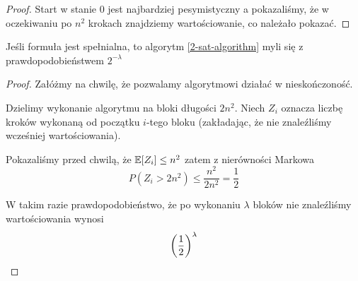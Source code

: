 \begin{proof}
	Start w stanie 0 jest najbardziej pesymistyczny a pokazaliśmy, że w oczekiwaniu po \( n^2 \) krokach znajdziemy wartościowanie, co należało pokazać.
\end{proof}

\begin{theorem}[Lemat 7.2 P\&C]
	Jeśli formuła jest spełnialna, to algorytm \ref{2-sat-algorithm} myli się z prawdopodobieństwem \( 2^{-\lambda} \)
\end{theorem}
\begin{proof}
	Załóżmy na chwilę, że pozwalamy algorytmowi działać w nieskończoność.

	Dzielimy wykonanie algorytmu na bloki długości \( 2n^2 \).
	Niech \( Z_i \) oznacza liczbę kroków wykonaną od początku \( i \)-tego bloku (zakładając, że nie znaleźliśmy wcześniej wartościowania).

	Pokazaliśmy przed chwilą, że \(\expected{Z_i} \leq n^2\) zatem z nierówności Markowa
	\[
		P(Z_i > 2n^2) \leq \frac{n^2}{2n^2} = \frac{1}{2}
	\]

	W takim razie prawdopodobieństwo, że po wykonaniu \( \lambda \) bloków nie znaleźliśmy wartościowania wynosi
	\[
		\left(\frac{1}{2}\right)^\lambda
	\]

\end{proof}
